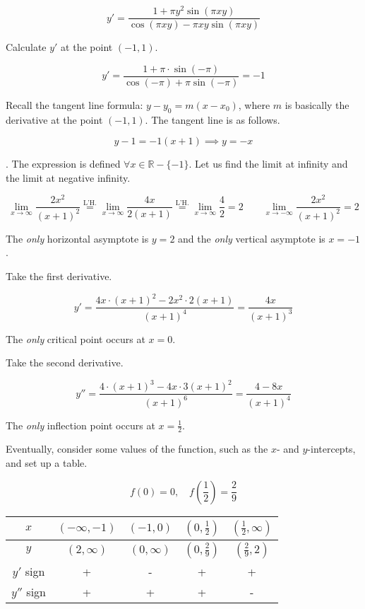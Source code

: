 \documentclass{article}
\begin{document}
\[y'=\frac{1+\pi y^2\sin(\pi xy)}{\cos(\pi xy)-\pi xy\sin(\pi xy)}\]

\noindent Calculate $y'$ at the point $(-1,1)$.

\[y' = \frac{1+\pi\cdot\sin(-\pi)}{\cos(-\pi)+\pi\sin(-\pi)}=-1\]

\hfill

\noindent Recall the tangent line formula: $y-y_0=m(x-x_0)$, where $m$ is basically the derivative at the point $(-1,1)$. The tangent line is as follows.

\[y-1=-1(x+1)\implies\boxed{y=-x}\]

\newpage

. The expression is defined $\forall x\in \mathbb{R}- \{-1\}$. Let us find the limit at infinity and the limit at negative infinity.

\[\lim_{x\to\infty}\frac{2x^2}{(x+1)^2}\overset{\text{L'H.}}{=}\lim_{x\to\infty}\frac{4x}{2(x+1)}\overset{\text{L'H.}}{=}\lim_{x\to\infty}\frac42=2\quad\quad\lim_{x\to-\infty}\frac{2x^2}{(x+1)^2}=2\]

\hfill

\noindent The \textit{only} horizontal asymptote is $y=2$ and the \textit{only} vertical asymptote is $x=-1$.

\hfill 

\noindent Take the first derivative.

\[y'=\frac{4x\cdot(x+1)^2-2x^2\cdot2(x+1)}{(x+1)^4}=\frac{4x}{(x+1)^3}\]

\hfill

\noindent The \textit{only} critical point occurs at $x=0$.

\hfill 

\noindent Take the second derivative.

\[y''=\frac{4\cdot(x+1)^3-4x\cdot3(x+1)^2}{(x+1)^6}=\frac{4-8x}{(x+1)^4}\]

\hfill 

\noindent The \textit{only} inflection point occurs at $\displaystyle x=\frac12$.

\hfill 

\noindent Eventually, consider some values of the function, such as the $x$- and $y$-intercepts, and set up a table.

\[f(0) = 0, \quad f\left(\frac12\right)=\frac29\]

\begin{center}
    \large
    \begin{tabular}{ |c| c c c c| } 
    \hline
        $x$ & $(-\infty,-1)$ & $(-1,0)$ & $\left(0,\frac12\right)$ & $\left(\frac12,\infty\right)$ \\
        \hline
        $y$ & $(2,\infty)$ & $(0,\infty)$ & $\left(0,\frac29\right)$ & $\left(\frac29,2\right)$ \\
        \hline
        $y'$ sign & + & - & + & + \\
        \hline
        $y''$ sign & + & + & + & - \\
        \hline
    \end{tabular}
\end{center}
\end{document}
